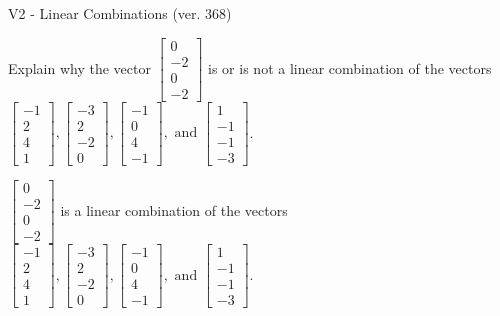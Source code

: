 \begin{exercise}
  \begin{exerciseTitle}V2 - Linear Combinations (ver. 368)\end{exerciseTitle}
  \begin{exerciseStatement}
    Explain why the vector \(\left[\begin{array}{c}
0 \\
-2 \\
0 \\
-2
\end{array}\right]\)  is or is not a linear 
	combination of the vectors \(\left[\begin{array}{c}
-1 \\
2 \\
4 \\
1
\end{array}\right] , \left[\begin{array}{c}
-3 \\
2 \\
-2 \\
0
\end{array}\right] , \left[\begin{array}{c}
-1 \\
0 \\
4 \\
-1
\end{array}\right] , \text{ and } \left[\begin{array}{c}
1 \\
-1 \\
-1 \\
-3
\end{array}\right]\).
	


  \end{exerciseStatement}
  \begin{exerciseAnswer}
   \(\left[\begin{array}{c}
0 \\
-2 \\
0 \\
-2
\end{array}\right]\) 
  	 is  
	a linear combination of the vectors \(\left[\begin{array}{c}
-1 \\
2 \\
4 \\
1
\end{array}\right] , \left[\begin{array}{c}
-3 \\
2 \\
-2 \\
0
\end{array}\right] , \left[\begin{array}{c}
-1 \\
0 \\
4 \\
-1
\end{array}\right] , \text{ and } \left[\begin{array}{c}
1 \\
-1 \\
-1 \\
-3
\end{array}\right]\).


\end{exerciseAnswer}
\end{exercise}
